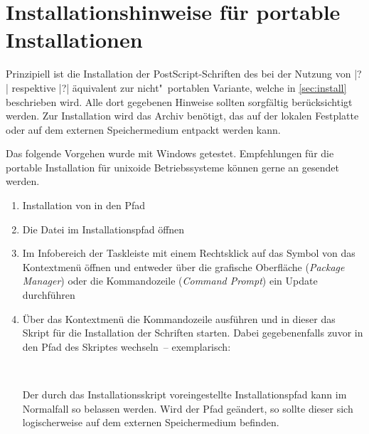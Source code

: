 \section{Installationshinweise für portable Installationen}
%
%
Prinzipiell ist die Installation der PostScript-Schriften des \CDs bei der 
Nutzung von |?| respektive  
|?| äquivalent zur nicht"~portablen 
Variante, welche in \autoref{sec:install} beschrieben wird. Alle dort gegebenen 
Hinweise sollten sorgfältig berücksichtigt werden. Zur Installation wird das 
Archiv
benötigt, das auf der lokalen Festplatte oder auf dem externen Speichermedium 
entpackt werden kann.

Das folgende Vorgehen wurde mit Windows getestet. Empfehlungen für die portable 
Installation für unixoide Betriebssysteme können gerne an \mailto{\tudscrmail} 
gesendet werden.
\begin{enumerate}
\item Installation von  in den Pfad
\item Die Datei  im Installationspfad öffnen
\item Im Infobereich der Taskleiste mit einem Rechtsklick auf das Symbol von 
   das Kontextmenü öffnen und entweder 
  über die grafische Oberfläche (\emph{Package Manager}) oder die Kommandozeile 
  (\emph{Command Prompt}) ein Update durchführen
\item Über das Kontextmenü die Kommandozeile ausführen und in dieser das Skript 
  für die Installation der Schriften  starten. 
  Dabei gegebenenfalls zuvor in den Pfad des Skriptes wechseln~-- exemplarisch:
  \begin{quoting}[rightmargin=0pt]
  \newline
  \,
  \end{quoting}
  Der durch das Installationsskript voreingestellte Installationspfad kann im 
  Normalfall so belassen werden. Wird der Pfad geändert, so sollte dieser sich 
  logischerweise auf dem externen Speichermedium 
   befinden.
\end{enumerate}

